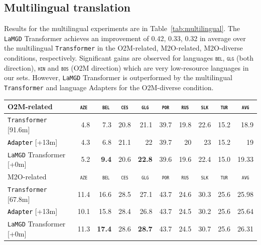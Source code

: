 \documentclass[11pt]{article}
\newcommand{\revision}[1]{\textcolor{black}{#1}}
\newcommand{\domain}[1]{\texttt{\textsc{#1}}}
\newcommand{\system}[1]{\texttt{{#1}}}
\newcommand{\SB}[1]{\textbf{#1}}
\begin{document}
\subsection{Multilingual translation}
Results for the multilingual experiments are in Table~\ref{tab:multilingual}.  The \system{LaMGD} Transformer achieves an improvement of 0.42, 0.33, 0.32 in average over the multilingual \system{Transformer} in the O2M-related, M2O-related, M2O-diverse conditions, respectively. Significant gains are observed for languages \domain{bel}, \domain{glg} (both direction), \domain{hin} and \domain{bos} (O2M direction) which are very low-resource languages in our sets. However, \system{LaMGD} Transformer is outperformed by the multilingual \system{Transformer} and language Adapters for the O2M-diverse condition.
\begin{table}[h!]
  \centering
  \begin{tabular}{|p{4cm}|*{9}{r|}} \hline
    O2M-related & \multicolumn{1}{c|}{\domain{aze}} & \multicolumn{1}{c|}{\domain{ bel}} & \multicolumn{1}{c|}{\domain{ces}} & \multicolumn{1}{c|}{\domain{glg}} & \multicolumn{1}{c|}{\domain{por}} & \multicolumn{1}{c|}{\domain{rus}} & \multicolumn{1}{c|}{\domain{slk}} & \multicolumn{1}{c|}{\domain{tur}} & \multicolumn{1}{c|}{\domain{avg}} \\ \hline 
    \system{Transformer}  \hfill{\footnotesize[91.6m]} & 4.8 &7.3&20.8&21.1&39.7&19.8&22.6&15.2&18.9 \\
    \revision{\system{Adapter}}   \hfill{\footnotesize[+13m]} &4.3&6.8&21.1&22&39.7&20&23&15.2&19 \\ 
    \system{LaMGD} Transformer  \hfill{\footnotesize[+0m]}  & 5.2&\SB{9.4}&20.6&\SB{22.8}&39.6&19.6&22.4&15.0&19.33 \\ 
	\hline
    \hline
    M2O-related & \multicolumn{1}{c|}{\domain{aze}} & \multicolumn{1}{c|}{\domain{ bel}} & \multicolumn{1}{c|}{\domain{ces}} & \multicolumn{1}{c|}{\domain{glg}} & \multicolumn{1}{c|}{\domain{por}} & \multicolumn{1}{c|}{\domain{rus}} & \multicolumn{1}{c|}{\domain{slk}} & \multicolumn{1}{c|}{\domain{tur}} & \multicolumn{1}{c|}{\domain{avg}} \\ \hline 
    \system{Transformer}  \hfill{\footnotesize[67.8m]} &11.4&16.6&28.5&	27.1&43.7&24.6&30.3&25.6&25.98 \\
    \revision{\system{Adapter}}   \hfill{\footnotesize[+13m]} &10.1&15.8&28.4&26.8&43.7&24.5&30.2&25.6&25.64\\ 
    \system{LaMGD} Transformer   \hfill{\footnotesize[+0m]}  &11.3&\SB{17.4}&28.6&\SB{28.7}&43.7&24.5&30.7&25.6&26.31 \\ 

\end{tabular}
\end{table}
\end{document}
